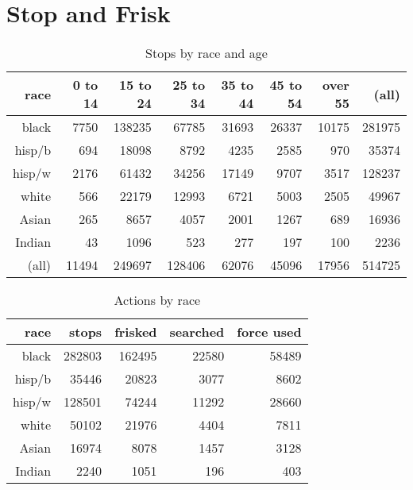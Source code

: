 \documentclass[letterpaper]{article}
\begin{document}
  \section{Stop and Frisk}

  \begin{table}[H]
    \centering
    \begin{tabular}{rrrrrrrr}
      \toprule
       race    & 0 to 14 & 15 to 24 & 25 to 34 & 35 to 44 & 45 to 54 & over 55 & (all) \\
      \midrule
      black    & 7750    & 138235   & 67785    & 31693    & 26337    & 10175   & 281975 \\
      hisp/b   & 694     & 18098    & 8792     & 4235     & 2585     & 970     & 35374 \\
      hisp/w   & 2176    & 61432    & 34256    & 17149    & 9707     & 3517    & 128237 \\
      white    & 566     & 22179    & 12993    & 6721     & 5003     & 2505    & 49967 \\
      Asian    & 265     & 8657     & 4057     & 2001     & 1267     & 689     & 16936 \\
      Indian   & 43      & 1096     & 523      & 277      & 197      & 100     & 2236 \\
      (all)    & 11494   & 249697   & 128406   & 62076    & 45096    & 17956   & 514725 \\
      \bottomrule
    \end{tabular}
    \caption{Stops by race and age}
  \end{table}

  \begin{table}[H]
    \centering
    \begin{tabular}{rrrrr}
      \toprule
      race     & stops  & frisked & searched & force used  \\
      \midrule 
      black    & 282803 & 162495  & 22580    & 58489 \\
      hisp/b   & 35446  & 20823   & 3077     & 8602  \\
      hisp/w   & 128501 & 74244   & 11292    & 28660 \\
      white    & 50102  & 21976   & 4404     & 7811  \\
      Asian    & 16974  & 8078    & 1457     & 3128  \\
      Indian   & 2240   & 1051    & 196      & 403  \\
      \bottomrule
    \end{tabular}
    \caption{Actions by race}
  \end{table}
\end{document}
